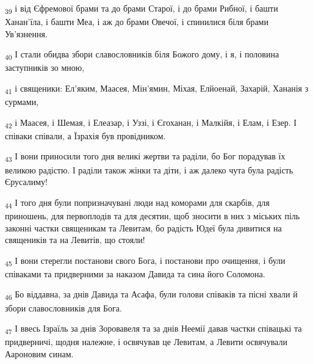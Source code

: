 \begin{tcolorbox}
\textsubscript{39} і від Єфремової брами та до брами Старої, і до брами Рибної, і башти Ханан'їла, і башти Меа, і аж до брами Овечої, і спинилися біля брами Ув'язнення.
\end{tcolorbox}
\begin{tcolorbox}
\textsubscript{40} І стали обидва збори славословників біля Божого дому, і я, і половина заступників зо мною,
\end{tcolorbox}
\begin{tcolorbox}
\textsubscript{41} і священики: Ел'яким, Маасея, Мін'ямин, Міхая, Елйоенай, Захарій, Хананія з сурмами,
\end{tcolorbox}
\begin{tcolorbox}
\textsubscript{42} і Маасея, і Шемая, і Елеазар, і Уззі, і Єгоханан, і Малкійя, і Елам, і Езер. І співаки співали, а Їзрахія був провідником.
\end{tcolorbox}
\begin{tcolorbox}
\textsubscript{43} І вони приносили того дня великі жертви та раділи, бо Бог порадував їх великою радістю. І раділи також жінки та діти, і аж далеко чута була радість Єрусалиму!
\end{tcolorbox}
\begin{tcolorbox}
\textsubscript{44} І того дня були попризначувані люди над коморами для скарбів, для приношень, для первоплодів та для десятин, щоб зносити в них з міських піль законні частки священикам та Левитам, бо радість Юдеї була дивитися на священиків та на Левитів, що стояли!
\end{tcolorbox}
\begin{tcolorbox}
\textsubscript{45} І вони стерегли постанови свого Бога, і постанови про очищення, і були співаками та придверними за наказом Давида та сина його Соломона.
\end{tcolorbox}
\begin{tcolorbox}
\textsubscript{46} Бо віддавна, за днів Давида та Асафа, були голови співаків та пісні хвали й збори славословників для Бога.
\end{tcolorbox}
\begin{tcolorbox}
\textsubscript{47} І ввесь Ізраїль за днів Зоровавеля та за днів Неемії давав частки співацькі та придверничі, щодня належне, і освячував це Левитам, а Левити освячували Аароновим синам.
\end{tcolorbox}
